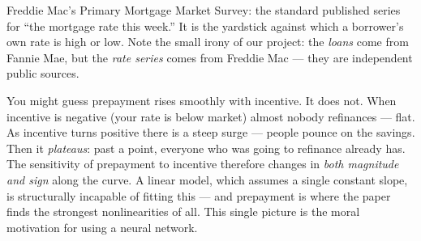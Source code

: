 \documentclass[11pt]{article}
\begin{document}
\begin{jargon}[PMMS]
Freddie Mac's Primary Mortgage Market Survey: the standard published series for ``the
mortgage rate this week.'' It is the yardstick against which a borrower's own rate is
high or low. Note the small irony of our project: the \emph{loans} come from Fannie Mae,
but the \emph{rate series} comes from Freddie Mac --- they are independent public sources.
\end{jargon}

\begin{intuition}
You might guess prepayment rises smoothly with incentive. It does not. When incentive is
negative (your rate is below market) almost nobody refinances --- flat. As incentive
turns positive there is a steep surge --- people pounce on the savings. Then it
\emph{plateaus}: past a point, everyone who was going to refinance already has. The
sensitivity of prepayment to incentive therefore changes in \emph{both magnitude and
sign} along the curve. A linear model, which assumes a single constant slope, is
structurally incapable of fitting this --- and prepayment is where the paper finds the
strongest nonlinearities of all. This single picture is the moral motivation for using a
neural network.
\end{intuition}
\end{document}
